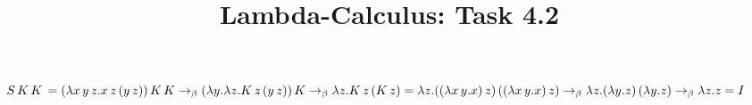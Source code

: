 \documentclass{article}
\title{Lambda-Calculus: Task 4.2}
\begin{document}
$
\\*S\,K\,K\, =
(\lambda x\,y\,z.x\,z\,(y\,z))\,K\,K \to_\beta
\\*(\lambda y.\lambda z.K\,z\,(y\,z))\,K \to_\beta
\\*\lambda z.K\,z\,(K\,z) =
\\*\lambda z.((\lambda x\,y.x)\,z)\,((\lambda x\,y.x)\,z) \to_\beta
\\*\lambda z.(\lambda y.z)\,(\lambda y.z) \to_\beta
\\*\lambda z.z = I
$
\end{document}
